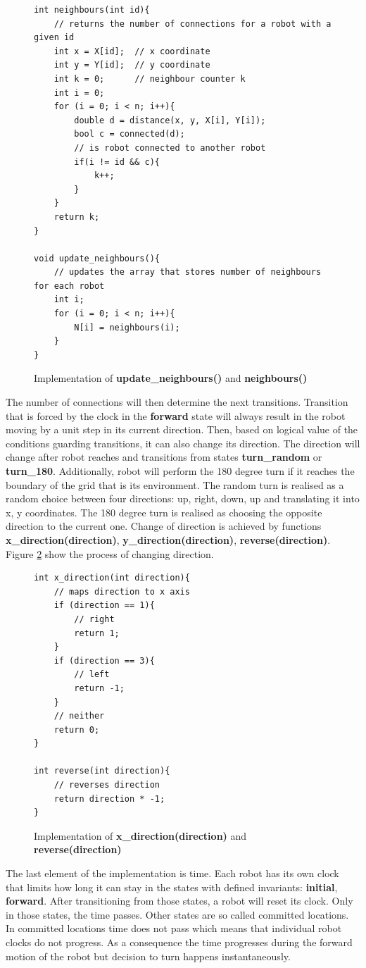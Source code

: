 \begin{figure}[H]
\caption{Implementation of \textbf{update\_neighbours()} and \textbf{neighbours()}}
\lstset { language=C++ }
\begin{lstlisting}
int neighbours(int id){
    // returns the number of connections for a robot with a given id
    int x = X[id];  // x coordinate
    int y = Y[id];  // y coordinate
    int k = 0;      // neighbour counter k
    int i = 0;   
    for (i = 0; i < n; i++){
        double d = distance(x, y, X[i], Y[i]);
        bool c = connected(d);
        // is robot connected to another robot
        if(i != id && c){
            k++;
        }
    }
    return k;
}

void update_neighbours(){
    // updates the array that stores number of neighbours for each robot
    int i;
    for (i = 0; i < n; i++){
        N[i] = neighbours(i);
    }
}
\end{lstlisting}
\label{fig:neighbours}
\end{figure}
\noindent
The number of connections will then determine the next transitions. Transition that is forced by the clock in the \textbf{forward} state will always result in the robot moving by a unit step in its current direction. Then, based on logical value of the conditions guarding transitions, it can also change its direction. The direction will change after robot reaches and transitions from states \textbf{turn\_random} or \textbf{turn\_180}. Additionally, robot will perform the 180 degree turn if it reaches the boundary of the grid that is its environment. The random turn is realised as a random choice between four directions: up, right, down, up and translating it into x, y coordinates. The 180 degree turn is realised as choosing the opposite direction to the current one. Change of direction is achieved by functions \textbf{x\_direction(direction)}, \textbf{y\_direction(direction)}, \textbf{reverse(direction)}. Figure \ref{fig:direction} show the process of changing direction.
\begin{figure}[H]
\caption{Implementation of \textbf{x\_direction(direction)} and \textbf{reverse(direction)}}
\lstset { language=C++ }
\begin{lstlisting}
int x_direction(int direction){
    // maps direction to x axis
    if (direction == 1){
        // right
        return 1;
    }
    if (direction == 3){
        // left
        return -1;
    }
    // neither
    return 0;
}

int reverse(int direction){
    // reverses direction
    return direction * -1;
}
\end{lstlisting}
\label{fig:direction}
\end{figure}
\noindent
The last element of the implementation is time. Each robot has its own clock that limits how long it can stay in the states with defined invariants: \textbf{initial}, \textbf{forward}. After transitioning from those states, a robot will reset its clock. Only in those states, the time passes. Other states are so called committed locations. In committed locations time does not pass which means that individual robot clocks do not progress. As a consequence the time progresses during the forward motion of the robot but decision to turn happens instantaneously.

